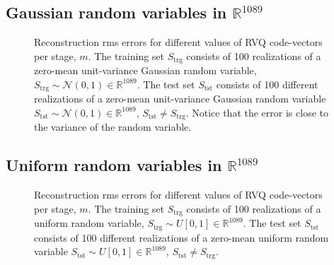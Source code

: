 \clearpage
\newpage
\subsection{Gaussian random variables in $\mathbb{R}^{1089}$}

								\begin{figure}[h]
								\centering
								\subtable{\begin{tiny}\end{tiny}}
								\caption{Reconstruction rms errors for different values of RVQ code-vectors per stage, $m$.  The training set $S_{\textrm{trg}}$ consists of 100 realizations of a zero-mean unit-variance Gaussian random variable, $S_{\textrm{trg}} \sim \mathcal{N}(0, 1) \in \mathbb{R}^{1089}$.  The test set $S_{\textrm{tst}}$ consists of 100 different realizations of a zero-mean unit-variance Gaussian random variable 	 $S_{\textrm{tst}} \sim \mathcal{N}(0, 1) \in \mathbb{R}^{1089}$, $S_{\textrm{tst}} \neq S_{\textrm{trg}}$.  Notice that the error is close to the variance of the random variable. }
								\label{fig:aRVQ_gaussian_rand}
								\end{figure}

\clearpage
\newpage
\subsection{Uniform random variables in $\mathbb{R}^{1089}$}
								\begin{figure}[h]
								\centering
								\subtable{\begin{tiny}\end{tiny}}
								\caption{Reconstruction rms errors for different values of RVQ code-vectors per stage, $m$.  The training set $S_{\textrm{trg}}$ consists of 100 realizations of a uniform random variable, $S_{\textrm{trg}} \sim U[0, 1] \in \mathbb{R}^{1089}$.  The test set $S_{\textrm{tst}}$ consists of 100 different realizations of a zero-mean uniform random variable 	 $S_{\textrm{tst}} \sim U[0, 1] \in \mathbb{R}^{1089}$, $S_{\textrm{tst}} \neq S_{\textrm{trg}}$.}
								\label{fig:aRVQ_uniform_rand}
								\end{figure}

